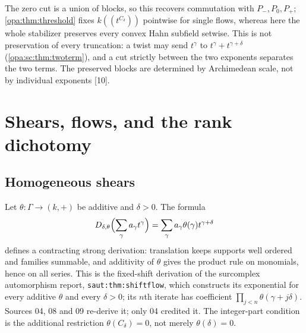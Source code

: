 \documentclass[11pt,oneside]{article}
\numberwithin{equation}{section}
\theoremstyle{definition}
\theoremstyle{remark}
\newcommand{\Hahn}[2]{#1((t^{#2}))}
\newcommand{\src}[1]{\textup{\textsf{\small[#1]}}}
\newcommand{\lbl}[1]{\nolinkurl{#1}}
\begin{document}
The zero cut is a union of blocks, so this recovers commutation with
$P_-,P_0,P_+$; \cref{opa:thm:threshold} fixes $\Hahn k{C_\delta}$ pointwise for
single flows, whereas here the whole stabilizer preserves every convex Hahn
subfield setwise. This is not preservation of every truncation: a twist may
send $t^\gamma$ to $t^\gamma+t^{\gamma+\delta}$ (\cref{opa:sc:thm:twoterm}), and a
cut strictly between the two exponents separates the two terms. The preserved
blocks are determined by Archimedean scale, not by individual exponents
\src{10}.

\section{Shears, flows, and the rank dichotomy}\label{opa:sec:shears}

\subsection{Homogeneous shears}

Let $\theta:\Gamma\to(k,+)$ be additive and $\delta>0$. The formula
\begin{equation}\label{opa:eq:Dshift}
 D_{\delta,\theta}\Bigl(\sum_\gamma a_\gamma t^\gamma\Bigr)
 =\sum_\gamma a_\gamma\theta(\gamma)t^{\gamma+\delta}
\end{equation}
defines a contracting strong derivation: translation keeps supports well
ordered and families summable, and additivity of $\theta$ gives the product
rule on monomials, hence on all series. This is the fixed-shift derivation of
the surcomplex automorphism report, \lbl{saut:thm:shiftflow}, which constructs
its exponential for every additive $\theta$ and every $\delta>0$; its $n$th
iterate has coefficient $\prod_{j<n}\theta(\gamma+j\delta)$. Sources 04, 08 and
09 re-derive it; only 04 credited it. The integer-part condition is the
additional restriction $\theta(C_\delta)=0$, not merely $\theta(\delta)=0$.
\end{document}
